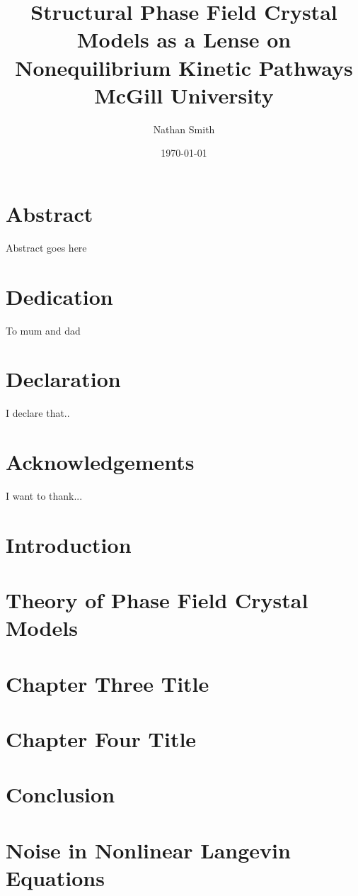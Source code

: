 \documentclass[11pt, letterpaper, twoside, openright]{book}
\title{
	{Structural Phase Field Crystal Models as a Lense on Nonequilibrium Kinetic Pathways}\\
	{\large McGill University}\\
}
\author{Nathan Smith}
\date{\today}
\begin{document}
\maketitle
\tableofcontents

\chapter*{Abstract}
Abstract goes here

\chapter*{Dedication}
To mum and dad

\chapter*{Declaration}
I declare that..

\chapter*{Acknowledgements}
I want to thank...

\tableofcontents

\chapter{Introduction}

\chapter{Theory of Phase Field Crystal Models}


\chapter{Chapter Three Title}

\chapter{Chapter Four Title}

\chapter{Conclusion}

\appendix
\chapter{Noise in Nonlinear Langevin Equations}


\end{document}
